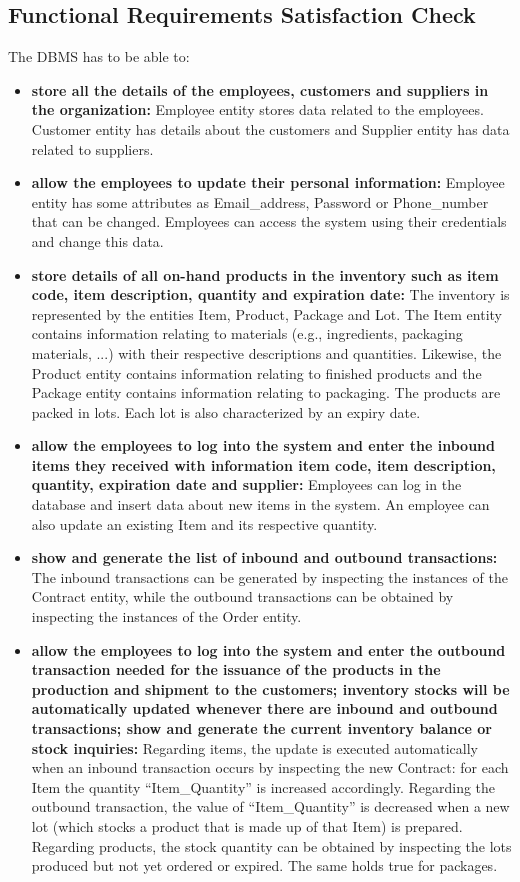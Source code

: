 \subsection{Functional Requirements Satisfaction Check}

The DBMS has to be able to:
\begin{itemize}
	\item \textbf{store all the details of the employees, customers and suppliers in the organization:} Employee entity stores data related to the employees. Customer entity has details about the customers and Supplier entity has data related to suppliers.
	\item \textbf{allow the employees to update their personal information:} Employee entity has some attributes as Email\_address, Password or Phone\_number that can be changed. Employees can access the system using their credentials and change this data.
	\item \textbf{store details of all on-hand products in the inventory such as item code, item description, quantity and expiration date:} The inventory is represented by the entities Item, Product, Package and Lot. The Item entity contains information relating to materials (e.g., ingredients, packaging materials, ...) with their respective descriptions and quantities. Likewise, the Product entity contains information relating to finished products and the Package entity contains information relating to packaging. The products are packed in lots. Each lot is also characterized by an expiry date.
	\item \textbf{allow the employees to log into the system and enter the inbound items they received with information item code, item description, quantity, expiration date and supplier:} Employees can log in the database and insert data about new items in the system. An employee can also update an existing Item and its respective quantity.
	\item \textbf{show and generate the list of inbound and outbound transactions:} The inbound transactions can be generated by inspecting the instances of the Contract entity, while the outbound transactions can be obtained by inspecting the instances of the Order entity.
	\item \textbf{allow the employees to log into the system and enter the outbound transaction needed for the issuance of the products in the production and shipment to the customers; inventory stocks will be automatically updated whenever there are inbound and outbound transactions; show and generate the current inventory balance or stock inquiries: } Regarding items, the update is executed automatically when an inbound transaction occurs by inspecting the new Contract: for each Item the quantity ``Item\_Quantity'' is increased accordingly. Regarding the outbound transaction, the value of ``Item\_Quantity'' is decreased when a new lot (which stocks a product that is made up of that Item) is prepared. Regarding products, the stock quantity can be obtained by inspecting the lots produced but not yet ordered or expired. The same holds true for packages.

\end{itemize}

